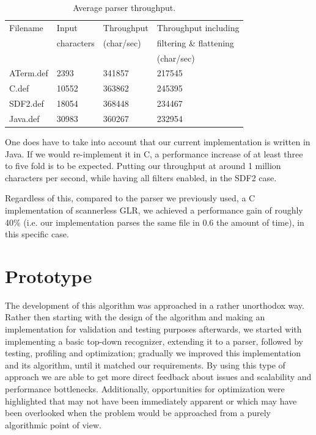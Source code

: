 \documentclass[a4paper,10pt]{article}
\begin{document}
\begin{table}[H]
\centering
\begin{tabular}{ | p{5em} | p{5em} | p{6em} | p{10em} |}
  \hline
  Filename & Input & Throughput & Throughput including\\
   & characters & (char/sec) & filtering \& flattening\\
   & & & (char/sec)\\
  \hline
  ATerm.def & 2393 & 341857 & 217545\\
  C.def & 10552 & 363862 & 245395\\
  SDF2.def & 18054 & 368448 & 234467\\
  Java.def & 30983 & 360267 & 232954\\
  \hline
\end{tabular}
\caption{Average parser throughput.}
\end{table}

One does have to take into account that our current implementation is written in Java. If we would re-implement it in C, a performance increase of at least three to five fold is to be expected. Putting our throughput at around 1 million characters per second, while having all filters enabled, in the SDF2 case.

Regardless of this, compared to the parser we previously used, a C implementation of scannerless GLR, we achieved a performance gain of roughly 40\% (i.e. our implementation parses the same file in 0.6 the amount of time), in this specific case.

\section{Prototype}

The development of this algorithm was approached in a rather unorthodox way. Rather then starting with the design of the algorithm and making an implementation for validation and testing purposes afterwards, we started with implementing a basic top-down recognizer, extending it to a parser, followed by testing, profiling and optimization; gradually we improved this implementation and its algorithm, until it matched our requirements. By using this type of approach we are able to get more direct feedback about issues and scalability and performance bottlenecks. Additionally, opportunities for optimization were highlighted that may not have been immediately apparent or which may have been overlooked when the problem would be approached from a purely algorithmic point of view.
\end{document}
